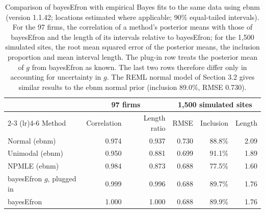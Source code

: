\begin{table}[!t]
\centering
\footnotesize
\begin{tabular}{@{}l rr rrr@{}}
\toprule
 & \multicolumn{2}{c}{97 firms} & \multicolumn{3}{c}{1,500 simulated sites} \\
\cmidrule(lr){2-3} \cmidrule(lr){4-6}
Method & Correlation & Length ratio & RMSE & Inclusion & Length \\
\midrule
Normal (ebnm) & 0.974 & 0.937 & 0.730 & 88.8\% & 2.09 \\
Unimodal (ebnm) & 0.950 & 0.881 & 0.699 & 91.1\% & 1.89 \\
NPMLE (ebnm) & 0.984 & 0.873 & 0.688 & 77.5\% & 1.60 \\
bayesEfron $g$, plugged in & 0.999 & 0.996 & 0.688 & 89.7\% & 1.76 \\
bayesEfron & 1.000 & 1.000 & 0.688 & 89.9\% & 1.76 \\
\bottomrule
\end{tabular}
\caption{Comparison of bayesEfron with empirical Bayes fits to the same data using ebnm (version 1.1.42; locations estimated where applicable; 90\% equal-tailed intervals). For the 97 firms, the correlation of a method's posterior means with those of bayesEfron and the length of its intervals relative to bayesEfron; for the 1,500 simulated sites, the root mean squared error of the posterior means, the inclusion proportion and mean interval length. The plug-in row treats the posterior mean of $g$ from bayesEfron as known. The last two rows therefore differ only in accounting for uncertainty in $g$. The REML normal model of Section 3.2 gives similar results to the ebnm normal prior (inclusion 89.0\%, RMSE 0.730).}
\label{tab:ebnm}
\end{table}
